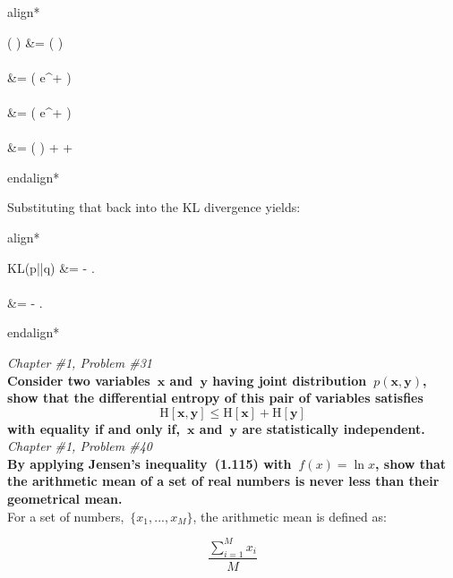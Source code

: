 \documentclass{report}
\newenvironment{aligncustom}
{ \csname align*\endcsname %
    \centering
}
{
  \csname endalign*\endcsname
}
\newcommand{\problem}[3]{\noindent \textit{Chapter \##1, Problem \##2}
  \\
  \textbf{#3}  \\}
\begin{document}
  \begin{aligncustom}
    \ln \left(  \right) &= \ln \left(    \right) \\~\\
    &= \ln \left(   e^{+} \right) \\~\\
    &= \ln \left(   e^{+} \right)\\~\\
    &= \ln \left(   \right) + +
  \end{aligncustom}
  
  Substituting that back into the KL divergence yields:
  
  \begin{aligncustom}
    \textrm{KL}(p||q) &= - \textrm{.} \\~\\
    &= - \textrm{.}
  \end{aligncustom}
  
  \newpage
  \problem{1}{31}{Consider two variables~$\mathbf{x}$ and~$\mathbf{y}$ having joint distribution~$p(\mathbf{x},\mathbf{y})$, show that the differential entropy of this pair of variables satisfies
  \[\textrm{H}[\mathbf{x},\mathbf{y}] \leq \textrm{H}[\mathbf{x}] + \textrm{H}[\mathbf{y}]\]
  with equality if and only if,~$\mathbf{x}$ and~$\mathbf{y}$ are statistically independent.}


  \newpage
  \problem{1}{40}{By applying Jensen's inequality~(1.115) with~$f(x)=\ln x$, show that the arithmetic mean of a set of real numbers is never less than their geometrical mean.}
  
  For a set of numbers,~$\{x_1,...,x_M\}$, the arithmetic mean is defined as:
  
  \[ \frac{\sum_{i=1}^{M}x_i}{M} \]
  
\end{document}
